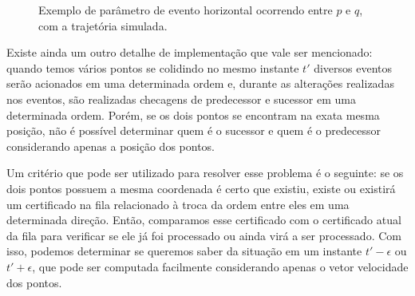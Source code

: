 \begin{figure}[h]
    \centering
    \caption{Exemplo de parâmetro de evento horizontal ocorrendo
    entre $p$ e $q$, com a trajetória simulada.}
    \label{degen:exemploeventos}
\end{figure}

Existe ainda um outro detalhe de implementação que vale ser mencionado:
quando temos vários pontos se colidindo no mesmo instante $t'$ diversos
eventos serão acionados em uma determinada ordem e, durante as alterações
realizadas nos eventos, são realizadas checagens de predecessor e sucessor
em uma determinada ordem. Porém, se os dois pontos se encontram na exata
mesma posição, não é possível determinar quem é o sucessor e quem é o
predecessor considerando apenas a posição dos pontos.

Um critério que pode ser utilizado para resolver esse problema é o seguinte:
se os dois pontos possuem a mesma coordenada é certo que existiu, existe ou
existirá um certificado na fila relacionado à troca da ordem entre eles em
uma determinada direção. Então, comparamos esse certificado com o
certificado atual da fila para verificar se ele já foi processado ou ainda
virá a ser processado. Com isso, podemos determinar se queremos saber da
situação em um instante $t' - \epsilon$ ou $t' + \epsilon$, que pode ser
computada facilmente considerando apenas o vetor velocidade dos pontos.
